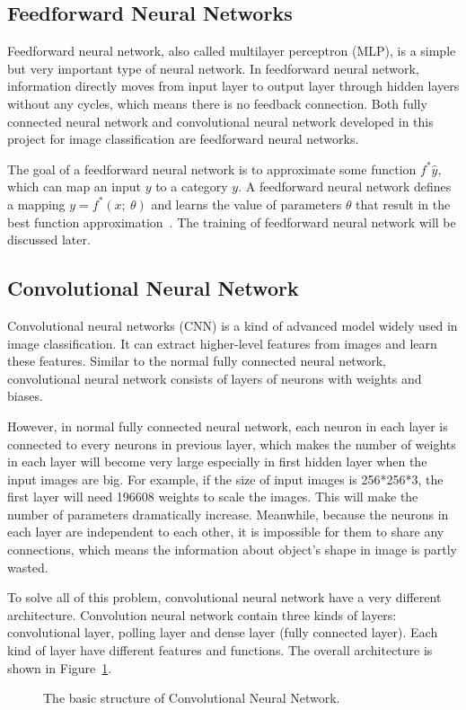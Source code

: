 \documentclass[]{UCD_CS_FYP_Report}
\begin{document}
\subsection{Feedforward Neural Networks}
Feedforward neural network, also called multilayer perceptron (MLP), is a simple but very important type of neural network. In feedforward neural network, information directly moves from input layer to output layer through hidden layers without any cycles, which means there is no feedback connection. Both fully connected neural network and convolutional neural network developed in this project for image classification are feedforward neural networks.

The goal of a feedforward neural network is to approximate some function $f^*\hat{y}$, which can map an input $y$ to a category $y$. A feedforward neural network defines a mapping $y=f^*(x;\ \theta{})$ and learns the value of parameters $\theta{}$ that result in the best function approximation~\cite{Goodfellow:2000}. The training of feedforward neural network will be discussed later.
%
\subsection{Convolutional Neural Network}
Convolutional neural networks (CNN) is a kind of advanced model widely used in image classification. It can extract higher-level features from images and learn these features. Similar to the normal fully connected neural network, convolutional neural network consists of layers of neurons with weights and biases.

However, in normal fully connected neural network, each neuron in each layer is connected to every neurons in previous layer, which makes the number of weights in each layer will become very large especially in first hidden layer when the input images are big. For example, if the size of input images is 256*256*3, the first layer will need 196608 weights to scale the images. This will make the number of parameters dramatically increase. Meanwhile, because the neurons in each layer are independent to each other, it is impossible for them to share any connections, which means the information about object’s shape in image is partly wasted. 

To solve all of this problem, convolutional neural network have a very different architecture. Convolution neural network contain three kinds of layers: convolutional layer, polling layer and dense layer (fully connected layer). Each kind of layer have different features and functions. The overall architecture is shown in Figure~\ref{fig:The basic structure of Convolutional Neural Network}.
\begin{figure}[h]
\centering
\fboxsep 2mm
\caption{\label{fig:The basic structure of Convolutional Neural Network} The basic structure of Convolutional Neural Network.}
\end{figure}
\end{document}
